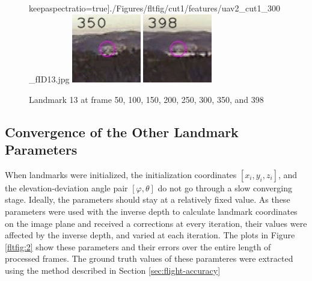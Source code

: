 \begin{figure}[h]
keepaspectratio=true]{./Figures/fltfig/cut1/features/uav2_cut1_300_fID13.jpg}
\includegraphics[width=3cm,
keepaspectratio=true]{./Figures/fltfig/cut1/features/uav2_cut1_350_fID13.jpg}
\includegraphics[width=3cm,
keepaspectratio=true]{./Figures/fltfig/cut1/features/uav2_cut1_398_fID13.jpg}
\caption{Landmark 13 at frame 50, 100, 150, 200, 250, 300, 350, and 398}
\label{fltfig:1_1}
\end{figure}

\subsection{Convergence of the Other Landmark Parameters}
When landmarks were initialized, the initialization coordinates $[x_i,
y_i, z_i]$, and the elevation-deviation angle pair $[\varphi, \theta]$
do not go through a slow converging stage. Ideally, the parameters
should stay at a relatively fixed value. As these parameters were used
with the inverse depth to calculate landmark coordinates on the image
plane and received a corrections at every iteration, their values were
affected by the inverse depth, and varied at each iteration. The plots
in Figure \ref{fltfig:2} show these parameters and their errors over
the entire length of processed frames. The ground truth values of these
paramteres were extracted using the method described in Section
\ref{sec:flight-accuracy}

